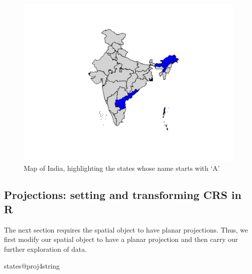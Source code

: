 \documentclass[]{article}
\newenvironment{Shaded}{}{}
\newcommand{\CommentTok}[1]{\textcolor[rgb]{0.38,0.63,0.69}{\textit{#1}}}
\newcommand{\DataTypeTok}[1]{\textcolor[rgb]{0.56,0.13,0.00}{#1}}
\newcommand{\KeywordTok}[1]{\textcolor[rgb]{0.00,0.44,0.13}{\textbf{#1}}}
\newcommand{\NormalTok}[1]{#1}
\newcommand{\OperatorTok}[1]{\textcolor[rgb]{0.40,0.40,0.40}{#1}}
\newcommand{\OtherTok}[1]{\textcolor[rgb]{0.00,0.44,0.13}{#1}}
\newcommand{\StringTok}[1]{\textcolor[rgb]{0.25,0.44,0.63}{#1}}
\begin{document}
\begin{Shaded}
\end{Shaded}

\begin{figure}
\centering
\includegraphics{TutorialNotebook_files/figure-latex/unnamed-chunk-9-1.pdf}
\caption{Map of India, highlighting the states whose name starts with
`A'}
\end{figure}

\hypertarget{projections-setting-and-transforming-crs-in-r}{%
\subsection{Projections: setting and transforming CRS in
R}\label{projections-setting-and-transforming-crs-in-r}}

The next section requires the spatial object to have planar projections.
Thus, we first modify our spatial object to have a planar projection and
then carry our further exploration of data.

\begin{Shaded}
\begin{Highlighting}[]
\NormalTok{states}\OperatorTok{@}\NormalTok{proj4string}
\end{Highlighting}
\end{Shaded}
\end{document}
